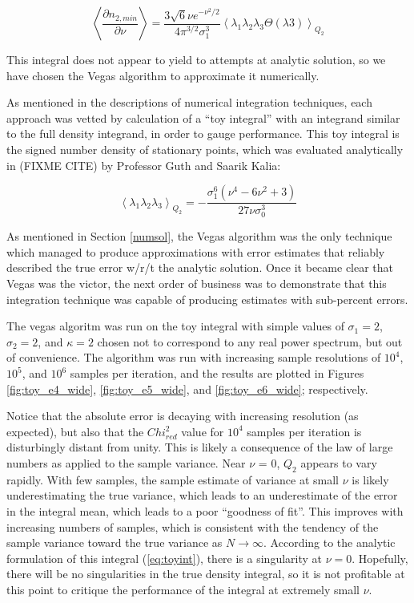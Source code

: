 \documentclass[10pt,letterpaper]{article}
\def\expect#1{\left\langle #1 \right\rangle} %
\begin{document}
$$\left\langle \frac{\partial n_{2,min}}{\partial \nu} \right\rangle = \displaystyle{\frac{3 \sqrt{6} \nu e^{-\nu^2/2}}{4 \pi^{3/2} \sigma_1^3}} \expect{\lambda_1 \lambda_2 \lambda_3 \Theta(\lambda 3)}_{Q_2}$$

This integral does not appear to yield to attempts at analytic solution, so we have chosen the Vegas algorithm to approximate it numerically.

As mentioned in the descriptions of numerical integration techniques, each approach was vetted by calculation of a ``toy integral'' with an integrand similar to the full density integrand, in order to gauge performance. This toy integral is the signed number density of stationary points, which was evaluated analytically in (FIXME CITE) by Professor Guth and Saarik Kalia:

\begin{equation} \label{eq:toyint}
\expect{\lambda_1 \lambda_2 \lambda_3}_{Q_2} = \displaystyle{- \frac{\sigma_1^6 (\nu^4 - 6\nu^2 +3)}{27 \nu \sigma_0^3}}
\end{equation}

As mentioned in Section \ref{numsol}, the Vegas algorithm was the only technique which managed to produce approximations with error estimates that reliably described the true error w/r/t the analytic solution. Once it became clear that Vegas was the victor, the next order of business was to demonstrate that this integration technique was capable of producing estimates with sub-percent errors. 

The vegas algoritm was run on the toy integral with simple values of $\sigma_1=2$, $\sigma_2=2$, and $\kappa=2$ chosen not to correspond to any real power spectrum, but out of convenience. The algorithm was run with increasing sample resolutions of $10^4$, $10^5$, and $10^6$ samples per iteration, and the results are plotted in Figures \ref{fig:toy_e4_wide}, \ref{fig:toy_e5_wide}, and \ref{fig:toy_e6_wide}; respectively.

Notice that the absolute error is decaying with increasing resolution (as expected), but also that the $Chi^2_{red}$ value for $10^4$ samples per iteration is disturbingly distant from unity. This is likely a consequence of the law of large numbers as applied to the sample variance. Near $\nu$ = 0, $Q_2$ appears to vary rapidly. With few samples, the sample estimate of variance at small $\nu$ is likely underestimating the true variance, which leads to an underestimate of the error in the integral mean, which leads to a poor ``goodness of fit''. This improves with increasing numbers of samples, which is consistent with the tendency of the sample variance toward the true variance as $N \rightarrow \infty$. According to the analytic formulation of this integral (\ref{eq:toyint}), there is a singularity at $\nu=0$. Hopefully, there will be no singularities in the true density integral, so it is not profitable at this point to critique the performance of the integral at extremely small $\nu$.
\end{document}
